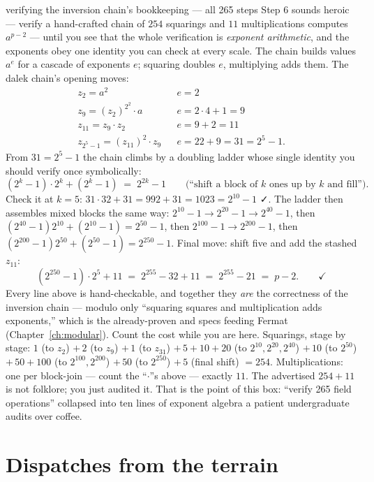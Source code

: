 \begin{worked}{verifying the inversion chain's bookkeeping --- all 265 steps}
Step 6 sounds heroic --- verify a hand-crafted chain of $254$ squarings
and $11$ multiplications computes $a^{p-2}$ --- until you see that the
whole verification is \emph{exponent arithmetic}, and the exponents obey
one identity you can check at every scale. The chain builds values
$a^{e}$ for a cascade of exponents $e$; squaring doubles $e$, multiplying
adds them. The dalek chain's opening moves:
\[
\begin{array}{lcl}
z_2 = a^2 & & e = 2\\
z_9 = (z_2)^{2^2} \cdot a & & e = 2\cdot 4 + 1 = 9\\
z_{11} = z_9 \cdot z_2 & & e = 9 + 2 = 11\\
z_{2^5-1} = (z_{11})^{2} \cdot z_9 & & e = 22 + 9 = 31 = 2^5 - 1 .
\end{array}
\]
From $31 = 2^5 - 1$ the chain climbs by a doubling ladder whose single
identity you should verify once symbolically:
\[
(2^k - 1)\cdot 2^k + (2^k - 1) \;=\; 2^{2k} - 1
\qquad\text{(``shift a block of $k$ ones up by $k$ and fill'').}
\]
Check it at $k=5$: $31 \cdot 32 + 31 = 992 + 31 = 1023 = 2^{10}-1$ ✓.
The ladder then assembles mixed blocks the same way:
$2^{10}-1 \to 2^{20}-1 \to 2^{40}-1$, then
$(2^{40}-1)2^{10} + (2^{10}-1) = 2^{50}-1$, then
$2^{100}-1 \to 2^{200}-1$, then
$(2^{200}-1)2^{50} + (2^{50}-1) = 2^{250}-1$. Final move: shift five and
add the stashed $z_{11}$:
\[
(2^{250}-1)\cdot 2^{5} + 11 \;=\; 2^{255} - 32 + 11 \;=\; 2^{255} - 21
\;=\; p - 2 . \qquad ✓
\]
Every line above is hand-checkable, and together they \emph{are} the
correctness of the inversion chain --- modulo only ``squaring squares and
multiplication adds exponents,'' which is the already-proven 
and  specs feeding Fermat (Chapter~\ref{ch:modular}). Count
the cost while you are here. Squarings, stage by stage:
$1$ (to $z_2$) $+\,2$ (to $z_9$) $+\,1$ (to $z_{31}$) $+\,5+10+20$ (to
$2^{10},2^{20},2^{40}$) $+\,10$ (to $2^{50}$) $+\,50+100$ (to
$2^{100},2^{200}$) $+\,50$ (to $2^{250}$) $+\,5$ (final shift)
$= 254$. Multiplications: one per block-join --- count the ``$\cdot$''s
above --- exactly $11$. The advertised $254 + 11$ is not folklore; you
just audited it. That is the point of this box: ``verify 265 field
operations'' collapsed into ten lines of exponent algebra a patient
undergraduate audits over coffee.
\end{worked}

\section{Dispatches from the terrain}

